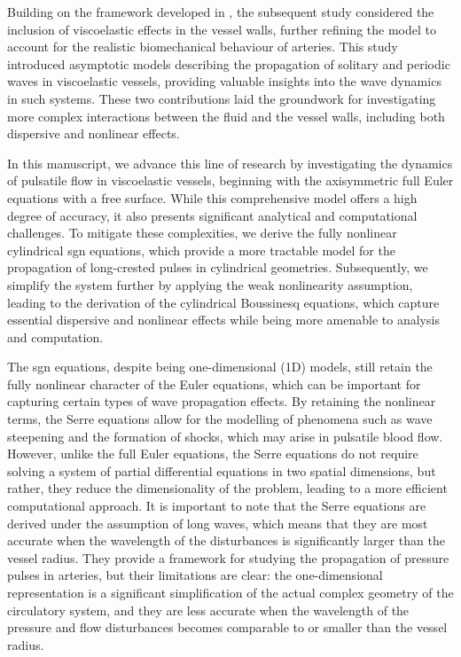 \documentclass[alpha-refs, 12pt]{wiley-article}
\begin{document}
Building on the framework developed in \cite{Mitsotakis2018}, the subsequent study \citep{Mitsotakis2019} considered the inclusion of viscoelastic effects in the vessel walls, further refining the model to account for the realistic biomechanical behaviour of arteries. This study introduced asymptotic models describing the propagation of solitary and periodic waves in viscoelastic vessels, providing valuable insights into the wave dynamics in such systems. These two contributions laid the groundwork for investigating more complex interactions between the fluid and the vessel walls, including both dispersive and nonlinear effects.

In this manuscript, we advance this line of research by investigating the dynamics of pulsatile flow in viscoelastic vessels, beginning with the axisymmetric full Euler equations with a free surface. While this comprehensive model offers a high degree of accuracy, it also presents significant analytical and computational challenges. To mitigate these complexities, we derive the fully nonlinear cylindrical \acrfull{sgn} equations, which provide a more tractable model for the propagation of long-crested pulses in cylindrical geometries. Subsequently, we simplify the system further by applying the weak nonlinearity assumption, leading to the derivation of the cylindrical Boussinesq equations, which capture essential dispersive and nonlinear effects while being more amenable to analysis and computation.

The \acrshort{sgn} equations, despite being one-dimensional (1D) models, still retain the fully nonlinear character of the Euler equations, which can be important for capturing certain types of wave propagation effects. By retaining the nonlinear terms, the Serre equations allow for the modelling of phenomena such as wave steepening and the formation of shocks, which may arise in pulsatile blood flow. However, unlike the full Euler equations, the Serre equations do not require solving a system of partial differential equations in two spatial dimensions, but rather, they reduce the dimensionality of the problem, leading to a more efficient computational approach. It is important to note that the Serre equations are derived under the assumption of long waves, which means that they are most accurate when the wavelength of the disturbances is significantly larger than the vessel radius. They provide a framework for studying the propagation of pressure pulses in arteries, but their limitations are clear: the one-dimensional representation is a significant simplification of the actual complex geometry of the circulatory system, and they are less accurate when the wavelength of the pressure and flow disturbances becomes comparable to or smaller than the vessel radius.
\end{document}
